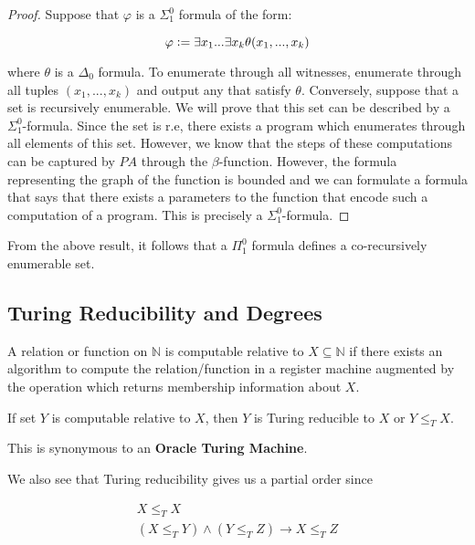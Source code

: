 \documentclass[a4paper,10pt]{article}
\newenvironment{definition}[1][Definition]{\begin{trivlist}
\item[\hskip \labelsep {\bfseries #1}]}{\end{trivlist}}
\let\phi\varphi
\newcommand*\NN{\mathbb{N}}
\newcommand*\map{\rightarrow}
\newcommand*\n{\newline\par}
\newcommand*\defeq{\vcentcolon=}
\newcommand*\turred{\leq_T}
\begin{document}
    \begin{proof}
     Suppose that $\phi$ is a $\Sigma_1^0$ formula of the form:
	
	\begin{equation*}
	 \phi \defeq \exists x_1 ... \exists x_k \theta(x_1,...,x_k)
	\end{equation*}

	where $\theta$ is a $\Delta_0$ formula. To enumerate through all witnesses, enumerate through all tuples $(x_1,...,x_k)$ and output any that satisfy $\theta$. Conversely, suppose that a set is recursively enumerable. We will prove that 
	this set can be described by a $\Sigma_1^0$-formula. Since the set is r.e, there exists a program which enumerates through all elements of this set. However, we know that the steps of these computations can be captured by $PA$ through the 
	$\beta$-function. However, the formula representing the graph of the function is bounded and we can formulate a formula that says that there exists a parameters to the function that encode such a computation of a program. This is precisely a $\Sigma_1^0$-formula.
    \end{proof}

    From the above result, it follows that a $\Pi_1^0$ formula defines a co-recursively enumerable set.
    
    \subsection{Turing Reducibility and Degrees}
    
    \begin{definition}
     A relation or function on $\NN$ is computable relative to $X \subseteq \NN$ if there exists an algorithm to compute the relation/function in a register machine augmented by the operation which
     returns membership information about $X$.
    \end{definition}
    
    
    \begin{definition}
     If set $Y$ is computable relative to $X$, then $Y$ is Turing reducible to $X$ or $Y \turred X$.
    \end{definition}
    This is synonymous to an {\bf Oracle Turing Machine}. \n
      
    
    We also see that Turing reducibility gives us a partial order since 
    
    \begin{gather*}
     X \turred X \\
     (X \turred Y) \land (Y \turred Z) \map X \turred Z
    \end{gather*}
\end{document}
